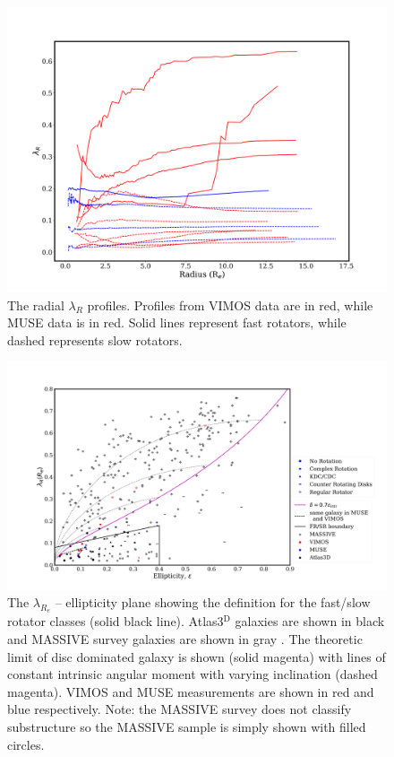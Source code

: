 {{		\begin{figure}
			\centering
			\includegraphics[width=.7\textwidth]{chapter4/lambda_R.png}
			\caption[$\lambda_{R}$ radial profiles]{The radial $\lambda_{R}$ profiles. Profiles from VIMOS data are in red, while MUSE data is in red. Solid lines represent fast rotators, while dashed represents slow rotators.}
			\label{fig:lambdaR_profile}
		\end{figure}


		\begin{figure}
			\centering
			\includegraphics[width=\textwidth]{chapter4/lambda_R_ellipticity.png}
			\caption[$\lambda_{R_e}$ -- ellipticity plane]{The $\lambda_{R_e}$ -- ellipticity plane showing the definition for the fast/slow rotator classes (solid black line). Atlas3$^\text{D}$ galaxies are shown in black \citep{Emsellem2011} and MASSIVE survey galaxies are shown in gray \citep{Veale2017}. The theoretic limit of disc dominated galaxy is shown (solid magenta) with lines of constant intrinsic angular moment with varying inclination (dashed magenta). VIMOS and MUSE measurements are shown in red and blue respectively. Note: the MASSIVE survey does not classify substructure so the MASSIVE sample is simply shown with filled circles.}
			\label{fig:lambdaR_ellip}
		\end{figure}


}}
